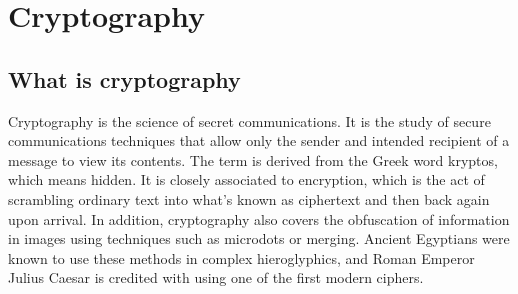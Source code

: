 \documentclass{report}
\begin{document}
\tableofcontents
\chapter{ Cryptography }
\section{ What is cryptography}

\Large{ Cryptography is the science of secret communications.
It is the study of secure communications techniques that allow only the sender and intended recipient of a message to view its contents. The term is derived from the Greek word kryptos, which means hidden. It is closely associated to encryption, which is the act of scrambling ordinary text into what's known as ciphertext and then back again upon arrival. In addition, cryptography also covers the obfuscation of information in images using techniques such as microdots or merging. Ancient Egyptians were known to use these methods in complex hieroglyphics, and Roman Emperor Julius Caesar is credited with using one of the first modern ciphers.


}
\end{document}
